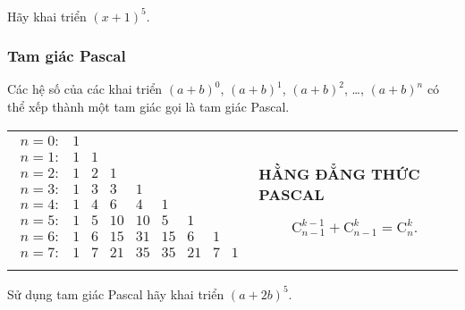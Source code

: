 \begin{vd}%
	Hãy khai triển  $\left(x+1\right)^5$.
\end{vd}



\subsubsection{Tam giác Pascal}

\begin{dn}
	Các hệ số của các khai triển $(a+b)^0$, $(a+b)^1$, $(a+b)^2$, \dots, $(a+b)^n$ có thể xếp thành một tam giác gọi là tam giác Pascal.
	\begin{longtable}{m{}m{}}
		$\begin{array}{lllllllll}
			n=0\colon & 1 & & & & & & &\\
			n=1\colon & 1 & 1 & & & & & &\\
			n=2\colon & 1 & 2 & 1 & & & & &\\
			n=3\colon & 1 & 3 & 3 & 1 & & & &\\
			n=4\colon & 1 & 4 & 6 & 4 & 1 & & &\\
			n=5\colon & 1 & 5 & 10 & 10 & 5 & 1 & &\\
			n=6\colon & 1 & 6 & 15 & 31 & 15 & 6 & 1 &\\
			n=7\colon & 1 & 7 & 21 & 35 & 35 & 21 & 7 & 1\\
		\end{array}$
		& \centerline{\bf HẰNG ĐẲNG THỨC PASCAL}\newline
		$$\mathrm{C}_{n-1}^{k-1}+\mathrm{C}_{n-1}^k=\mathrm{C}_n^k.$$
	\end{longtable}
\end{dn}


\begin{vd}%
	Sử dụng tam giác Pascal hãy khai triển  $(a+2b)^5$.
\end{vd}

